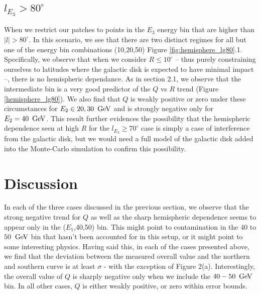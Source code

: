 \subsection{$l_{E_3} > 80^{\circ}$}
When we restrict our patches to points in the $E_{3}$ energy bin that are higher
than $|l| > 80^{\circ}$.
In this scenario, we see that there are two distinct regimes for all but one of
the energy bin combinations (10,20,50) Figure \ref{fig:hemisphere_lg80}.1.
Specifically, we observe that when we consider $R\leq10^{\circ}$ -- thus 
purely constraining ourselves to latitudes where the galactic disk is
expected to have minimal impact --, there is no hemispheric dependance.
As in section 2.1, we observe that the intermediate bin is a very good
predictor of the $Q$ vs $R$ trend (Figure \ref{hemisphere_lg80}).
We also find that $Q$ is weakly positive or zero under these circumstances
for $E_{2}\in{20,30}\ \,{\rm GeV}$ and is strongly negative only for 
$E_2=40\ \,{\rm GeV}$.
This result further evidences the possibility that the hemispheric dependence
seen at high $R$ for the $l_{E_3}\geq70^{\circ}$ case is simply a case
of interference from the galactic disk, but we would need a full model of 
the galactic disk added into the Monte-Carlo simulation to confirm this
possibility.

\section{Discussion}
In each of the three cases discussed in the previous section, we observe that
the strong negative trend for $Q$ as well as the sharp hemispheric dependence
seems to appear only in the ($E_1$,40,50) bin. 
This might point to contamination in the $40$ to $50$ $\,{\rm GeV}$ bin that hasn't 
been accounted for in this setup, or it might point to some interesting 
physics.
Having said this, in each of the cases presented above, we find that the 
deviation between the measured overall value and the northern and southern
curve is at least $\sigma$ - with the exception of Figure 2(a).
Interestingly, the overall value of $Q$ is sharply negative only when we 
include the $40-50\ \,{\rm GeV}$ bin.
In all other cases, $Q$ is either weakly positive, or zero within error bounds.

